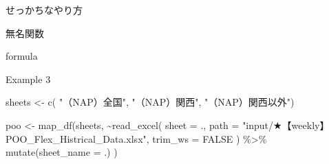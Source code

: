 \documentclass[
  ignorenonframetext,
  aspectratio=169]{beamer}
\newenvironment{Shaded}{\begin{snugshade}}{\end{snugshade}}
\newcommand{\AttributeTok}[1]{\textcolor[rgb]{0.77,0.63,0.00}{#1}}
\newcommand{\ConstantTok}[1]{\textcolor[rgb]{0.00,0.00,0.00}{#1}}
\newcommand{\ControlFlowTok}[1]{\textcolor[rgb]{0.13,0.29,0.53}{\textbf{#1}}}
\newcommand{\FunctionTok}[1]{\textcolor[rgb]{0.00,0.00,0.00}{#1}}
\newcommand{\NormalTok}[1]{#1}
\newcommand{\OtherTok}[1]{\textcolor[rgb]{0.56,0.35,0.01}{#1}}
\newcommand{\SpecialCharTok}[1]{\textcolor[rgb]{0.00,0.00,0.00}{#1}}
\newcommand{\StringTok}[1]{\textcolor[rgb]{0.31,0.60,0.02}{#1}}
\begin{document}
\begin{frame}[fragile]{せっかちなやり方}
\protect\hypertarget{ux305bux3063ux304bux3061ux306aux3084ux308aux65b9}{}
\begin{block}{無名関数}
\protect\hypertarget{ux7121ux540dux95a2ux6570}{}
\begin{Shaded}
\end{Shaded}
\end{block}

\begin{block}{formula}
\protect\hypertarget{formula}{}
\begin{Shaded}
\end{Shaded}
\end{block}
\end{frame}

\begin{frame}[fragile]{Example 3}
\protect\hypertarget{example-3}{}
\begin{Shaded}
\begin{Highlighting}[]
\NormalTok{sheets }\OtherTok{\textless{}{-}} \FunctionTok{c}\NormalTok{( }\StringTok{"（NAP）全国"}\NormalTok{,}
        \StringTok{"（NAP）関西"}\NormalTok{,}
        \StringTok{"（NAP）関西以外"}\NormalTok{)}

\NormalTok{poo }\OtherTok{\textless{}{-}} \FunctionTok{map\_df}\NormalTok{(sheets,}
       \SpecialCharTok{\textasciitilde{}}\FunctionTok{read\_excel}\NormalTok{(}
         \AttributeTok{sheet =}\NormalTok{ .,}
         \AttributeTok{path =} \StringTok{"input/★【weekly】POO\_Flex\_Histrical\_Data.xlsx"}\NormalTok{,}
         \AttributeTok{trim\_ws =} \ConstantTok{FALSE}
\NormalTok{       ) }\SpecialCharTok{\%\textgreater{}\%} 
         \FunctionTok{mutate}\NormalTok{(}\AttributeTok{sheet\_name =}\NormalTok{ .)}
\NormalTok{     ) }
\end{Highlighting}
\end{Shaded}
\end{frame}
\end{document}
